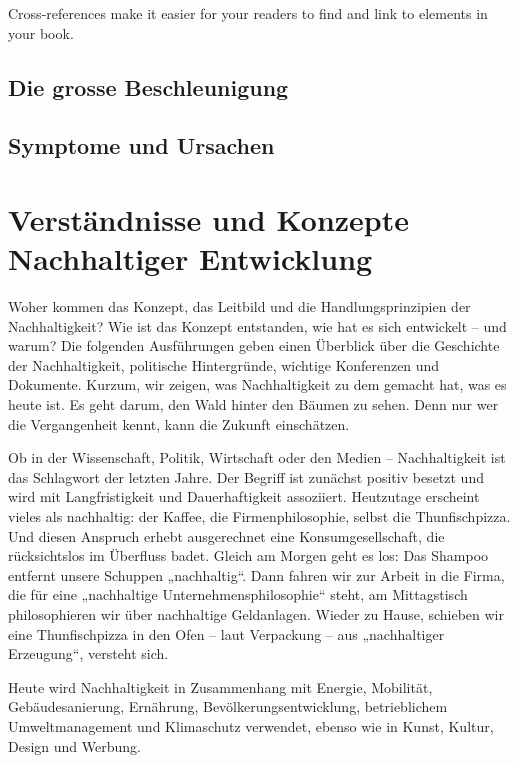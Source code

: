 \documentclass[
]{book}
\begin{document}
Cross-references make it easier for your readers to find and link to elements in your book.

\hypertarget{beschleunigung}{%
\section{Die grosse Beschleunigung}\label{beschleunigung}}

\hypertarget{symptome_ursachen}{%
\section{Symptome und Ursachen}\label{symptome_ursachen}}

\hypertarget{verstuxe4ndnisse_konzepte}{%
\chapter{Verständnisse und Konzepte Nachhaltiger Entwicklung}\label{verstuxe4ndnisse_konzepte}}

Woher kommen das Konzept, das Leitbild und die Handlungsprinzipien der Nachhaltigkeit? Wie ist das Konzept entstanden, wie hat es sich entwickelt -- und warum? Die folgenden Ausführungen geben einen Überblick über die Geschichte der Nachhaltigkeit, politische Hintergründe, wichtige Konferenzen und Dokumente. Kurzum, wir zeigen, was Nachhaltigkeit zu dem gemacht hat, was es heute ist. Es geht darum, den Wald hinter den Bäumen zu sehen. Denn nur wer die Vergangenheit kennt, kann die Zukunft einschätzen.

Ob in der Wissenschaft, Politik, Wirtschaft oder den Medien -- Nachhaltigkeit ist das Schlagwort der letzten Jahre. Der Begriff ist zunächst positiv besetzt und wird mit Langfristigkeit und Dauerhaftigkeit assoziiert. Heutzutage erscheint vieles als nachhaltig: der Kaffee, die Firmenphilosophie, selbst die Thunfischpizza. Und diesen Anspruch erhebt ausgerechnet eine Konsumgesellschaft, die rücksichtslos im Überfluss badet. Gleich am Morgen geht es los: Das Shampoo entfernt unsere Schuppen „nachhaltig``. Dann fahren wir zur Arbeit in die Firma, die für eine „nachhaltige Unternehmensphilosophie`` steht, am Mittagstisch philosophieren wir über nachhaltige Geldanlagen. Wieder zu Hause, schieben wir eine Thunfischpizza in den Ofen -- laut Verpackung -- aus „nachhaltiger Erzeugung``, versteht sich.

Heute wird Nachhaltigkeit in Zusammenhang mit Energie, Mobilität, Gebäudesanierung, Ernährung, Bevölkerungsentwicklung, betrieblichem Umweltmanagement und Klimaschutz verwendet, ebenso wie in Kunst, Kultur, Design und Werbung.
\end{document}
